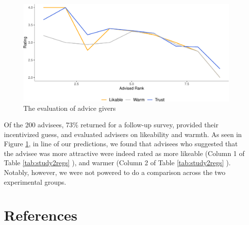 \documentclass[
  man,floatsintext]{apa6}
\begin{document}
\begin{figure}

{\centering \includegraphics{Advice-Giving_files/figure-latex/study2rating-1} 

}

\caption{The evaluation of advice givers}\label{fig:study2rating}
\end{figure}

Of the 200 advisees, 73\% returned for a follow-up survey, provided their incentivized guess, and evaluated advisers on likeability and warmth. As seen in Figure \ref{fig:study2rating}, in line of our predictions, we found that advisees who suggested that the advisee was more attractive were indeed rated as more likeable (Column 1 of Table \ref{tab:study2regs} ), and warmer (Column 2 of Table \ref{tab:study2regs} ). Notably, however, we were not powered to do a comparison across the two experimental groups.

\hypertarget{references}{%
\section{References}\label{references}}

\begingroup
\singlespacing
\setlength{\parindent}{-0.2in}
\setlength{\leftskip}{0.2in}
\noindent
\end{document}
